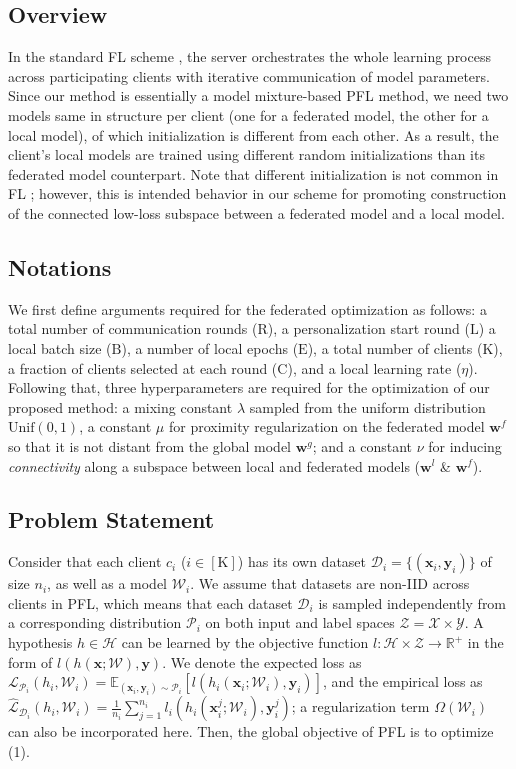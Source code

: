 \documentclass[sigconf]{acmart}
\begin{document}
\subsection{Overview} In the standard FL scheme \cite{mc+17}, the server orchestrates the whole learning process across participating clients with iterative communication of model parameters. Since our method is essentially a model mixture-based PFL method, we need two models same in structure per client (one for a federated model, the other for a local model), of which initialization is different from each other. As a result, the client's local models are trained using different random initializations than its federated model counterpart. Note that different initialization is not common in FL \cite{mc+17}; however, this is intended behavior in our scheme for promoting construction of the connected low-loss subspace between a federated model and a local model.  
\subsection{Notations} We first define arguments required for the federated optimization as follows: a total number of communication rounds ($\mathrm{R}$), a personalization start round ($\mathrm{L}$) a local batch size ($\mathrm{B}$), a number of local epochs ($\mathrm{E}$), a total number of clients ($\mathrm{K}$), a fraction of clients selected at each round ($\mathrm{C}$), and a local learning rate ($\eta$). Following that, three hyperparameters are required for the optimization of our proposed method: a mixing constant $\lambda$ sampled from the uniform distribution $\text{Unif}(0,1)$, a constant $\mu$ for proximity regularization on the federated model $\mathbf{w}^f$ so that it is not distant from the global model $\mathbf{w}^g$; and a constant $\nu$ for inducing \textit{connectivity} along a subspace between local and federated models ($\mathbf{w}^l$ \& $\mathbf{w}^f$).

\subsection{Problem Statement} Consider that each client $c_i$ ($i\in[\mathrm{K}]$) has its own dataset $\mathcal{D}_i=\{(\mathbf{x}_i,\mathbf{y}_i)\}$ of size $n_i$, as well as a model $\mathcal{W}_i$. We assume that datasets are non-IID across clients in PFL, which means that each dataset $\mathcal{D}_i$ is sampled independently from a corresponding distribution $\mathcal{P}_i$ on both input and label spaces $\mathcal{Z}=\mathcal{X}\times\mathcal{Y}$. A hypothesis $h\in\mathcal{H}$ can be learned by the objective function $l:\mathcal{H}\times\mathcal{Z}\rightarrow\mathbb{R}^{+}$ in the form of $l(h(\mathbf{x};\mathcal{W}),\mathbf{y})$. We denote the expected loss as $\mathcal{L}_{\mathcal{P}_i}(h_i, \mathcal{W}_i)=\mathbb{E}_{(\mathbf{x}_i,\mathbf{y}_i)\sim\mathcal{P}_i}[l(h_i(\mathbf{x}_i;\mathcal{W}_i),\mathbf{y}_i)]$, and the empirical loss as $\hat{\mathcal{L}}_{\mathcal{D}_i}(h_i, \mathcal{W}_i)=\frac{1}{n_i}\sum_{j=1}^{n_i}l_i(h_i(\mathbf{x}_i^j;\mathcal{W}_i),\mathbf{y}_i^j)$; a regularization term $\Omega(\mathcal{W}_i)$ can also be incorporated here. Then, the global objective of PFL is to optimize (1).
\end{document}
